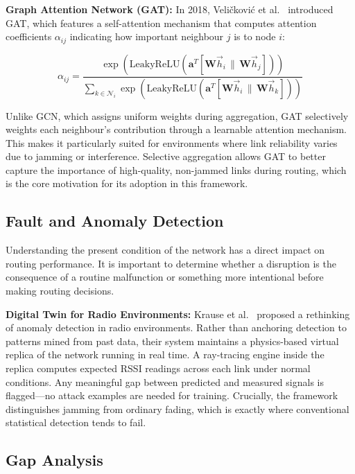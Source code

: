 \documentclass[conference]{IEEEtran}
\begin{document}
\textbf{Graph Attention Network (GAT):}
In 2018, Veli\v{c}kovi\'{c} et al.~\cite{velickovic2018} introduced GAT, which features a self-attention mechanism that computes attention coefficients $\alpha_{ij}$ indicating how important neighbour $j$ is to node $i$:

\begin{equation}
  \alpha_{ij} = \frac{
    \exp\!\left(\mathrm{LeakyReLU}\!\left(\mathbf{a}^T \left[\mathbf{W}\vec{h}_i \,\|\, \mathbf{W}\vec{h}_j\right]\right)\right)
  }{
    \displaystyle\sum_{k \in \mathcal{N}_i} \exp\!\left(\mathrm{LeakyReLU}\!\left(\mathbf{a}^T \left[\mathbf{W}\vec{h}_i \,\|\, \mathbf{W}\vec{h}_k\right]\right)\right)
  }
  \label{eq:gat}
\end{equation}

Unlike GCN, which assigns uniform weights during aggregation, GAT selectively weights each neighbour's contribution through a learnable attention mechanism. This makes it particularly suited for environments where link reliability varies due to jamming or interference. Selective aggregation allows GAT to better capture the importance of high-quality, non-jammed links during routing, which is the core motivation for its adoption in this framework.

\subsection{Fault and Anomaly Detection}

Understanding the present condition of the network has a direct impact on routing performance. It is important to determine whether a disruption is the consequence of a routine malfunction or something more intentional before making routing decisions.

\textbf{Digital Twin for Radio Environments:}
Krause et al.~\cite{krause2023} proposed a rethinking of anomaly detection in radio environments. Rather than anchoring detection to patterns mined from past data, their system maintains a physics-based virtual replica of the network running in real time. A ray-tracing engine inside the replica computes expected RSSI readings across each link under normal conditions. Any meaningful gap between predicted and measured signals is flagged—no attack examples are needed for training. Crucially, the framework distinguishes jamming from ordinary fading, which is exactly where conventional statistical detection tends to fail.

\subsection{Gap Analysis}
\end{document}
